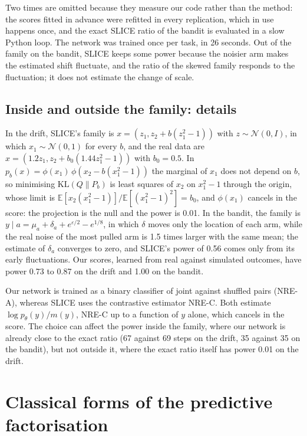 \documentclass[11pt]{article}
\newcommand{\E}{\mathbb{E}}
\newcommand{\KL}{\mathrm{KL}}
\theoremstyle{remark}
\begin{document}
Two times are omitted because they measure our code rather than the method:
the scores fitted in advance were refitted in every replication, which in use
happens once, and the exact SLICE ratio of the bandit is evaluated in a slow
Python loop. The network was trained once per task, in 26 seconds. Out of the
family on the bandit, SLICE keeps some power because the noisier arm makes the
estimated shift fluctuate, and the ratio of the skewed family responds to the
fluctuation; it does not estimate the change of scale.

\subsection{Inside and outside the family: details}

In the drift, SLICE's family is $x = (z_1, z_2 + b(z_1^2 - 1))$ with
$z \sim \mathcal N(0, I)$, in which $x_1 \sim \mathcal N(0, 1)$ for every $b$,
and the real data are $x = (1.2 z_1, z_2 + b_0(1.44 z_1^2 - 1))$ with
$b_0 = 0.5$. In $p_b(x) = \phi(x_1)\,\phi(x_2 - b(x_1^2 - 1))$ the marginal of
$x_1$ does not depend on $b$, so minimising $\KL(Q\|P_b)$ is least squares of
$x_2$ on $x_1^2 - 1$ through the origin, whose limit is
$\E[x_2(x_1^2 - 1)]/\E[(x_1^2 - 1)^2] = b_0$, and $\phi(x_1)$ cancels in the
score: the projection is the null and the power is 0.01. In the bandit, the
family is $y \mid a = \mu_a + \delta_a + e^{\varepsilon/2} - e^{1/8}$, in which
$\delta$ moves only the location of each arm, while the real noise of the most
pulled arm is 1.5 times larger with the same mean; the estimate of $\delta_a$
converges to zero, and SLICE's power of 0.56 comes only from its early
fluctuations. Our scores, learned from real against simulated outcomes, have
power 0.73 to 0.87 on the drift and 1.00 on the bandit.

Our network is trained as a binary classifier of joint against shuffled pairs
(NRE-A), whereas SLICE uses the contrastive estimator NRE-C. Both estimate
$\log p_\theta(y)/m(y)$, NRE-C up to a function of $y$ alone, which cancels in
the score. The choice can affect the power inside the family, where our network
is already close to the exact ratio (67 against 69 steps on the drift, 35
against 35 on the bandit), but not outside it, where the exact ratio itself has
power 0.01 on the drift.

\section{Classical forms of the predictive factorisation}\label{sec:factorisation}
\end{document}
